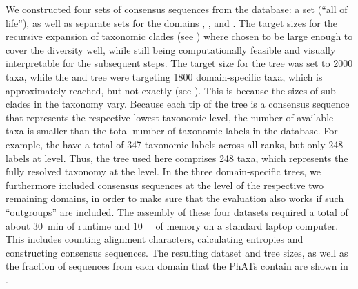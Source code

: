 We constructed four sets of consensus sequences from the  database:
a  set (``all of life''),
as well as separate sets for the domains , , and .
The target sizes for the recursive expansion of taxonomic clades
(see )
where chosen to be large enough to cover the diversity well,
while still being computationally feasible and visually interpretable for the subsequent steps.
The target size for the  tree was set to \num{2 000} taxa,
while the  and  tree were targeting \num{1 800} domain-specific taxa,
which is approximately reached, but not exactly (see ).
This is because the sizes of sub-clades in the taxonomy vary.
Because each tip of the tree is a consensus sequence that represents the respective lowest taxonomic level,
the number of available taxa is smaller than the total number of taxonomic labels in the  database.
For example, the  have a total of  \num{347} taxonomic labels across all ranks,
but only \num{248} labels at  level.
Thus, the  tree used here comprises \num{248} taxa,
which represents the fully resolved  taxonomy at the  level.
In the three domain-specific trees, we furthermore included consensus sequences at the  level
of the respective two remaining domains,
in order to make sure that the evaluation also works if such ``outgroups'' are included.
The assembly of these four datasets required a total of
about \SI{30}{\minute} of runtime and \SI{10}{\giga\byte} of memory on a standard laptop computer.
This includes counting alignment characters, calculating entropies and constructing consensus sequences.
The resulting dataset and tree sizes, as well as the fraction of sequences from each domain that the \acp{PhAT} contain
are shown in .

